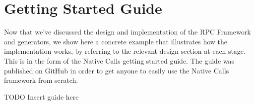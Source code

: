 \section{Getting Started Guide} %
\label{sec:end_to_end_example}
Now that we've discussed the design and implementation of the RPC Framework and generators, we show here a concrete example that illustrates how the implementation works, by referring to the relevant design section at each stage. This is in the form of the Native Calls getting started guide. The guide was published on GitHub in order to get anyone to easily use the Native Calls framework from scratch.

TODO Insert guide here